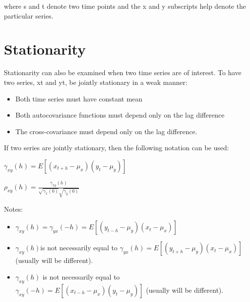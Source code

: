 \documentclass[
]{book}
\providecommand{\tightlist}{%
  \setlength{\itemsep}{0pt}\setlength{\parskip}{0pt}}
\theoremstyle{definition}
\theoremstyle{definition}
\theoremstyle{definition}
\theoremstyle{definition}
\theoremstyle{remark}
\begin{document}
where s and t denote two time points and the x and y subscripts help denote the particular series.

\hypertarget{stationarity-2}{%
\section{Stationarity}\label{stationarity-2}}

Stationarity can also be examined when two time series are of interest. To have two series, xt and yt, be jointly stationary in a weak manner:

\begin{itemize}
\tightlist
\item
  Both time series must have constant mean
\item
  Both autocovariance functions must depend only on the lag difference
\item
  The cross-covariance must depend only on the lag difference.
\end{itemize}

If two series are jointly stationary, then the following notation can be used:

\(\gamma_{xy}(h)=E[(x_{t+h}-\mu_x)(y_t-\mu_y)]\)

\(\rho_{xy}(h)=\frac{\gamma_{xy}(h)}{\sqrt{\gamma_x(0)}\sqrt{\gamma_y(0)}}\)

Notes:

\begin{itemize}
\tightlist
\item
  \(\gamma_{xy}(h) = \gamma_{yx}(-h)=E[(y_{t-h}-\mu_y)(x_t-\mu_x)]\)
\item
  \(\gamma_{xy}(h)\)is not necessarily equal to \(\gamma_{yx}(h)=E[(y_{t+h}-\mu_y)(x_t-\mu_x)]\) (usually will be different).
\item
  \(\gamma_{xy}(h)\) is not necessarily equal to \(\gamma_{xy}(-h)=E[(x_{t-h}-\mu_x)(y_t-\mu_y)]\) (usually will be different).
\end{itemize}
\end{document}
